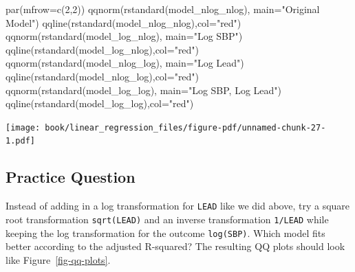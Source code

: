 \documentclass[
  letterpaper,
]{krantz}
\makeatletter
\newenvironment{Shaded}{\begin{snugshade}}{\end{snugshade}}
\newcommand{\AttributeTok}[1]{\textcolor[rgb]{0.40,0.45,0.13}{#1}}
\newcommand{\DecValTok}[1]{\textcolor[rgb]{0.68,0.00,0.00}{#1}}
\newcommand{\FunctionTok}[1]{\textcolor[rgb]{0.28,0.35,0.67}{#1}}
\newcommand{\NormalTok}[1]{\textcolor[rgb]{0.00,0.23,0.31}{#1}}
\newcommand{\StringTok}[1]{\textcolor[rgb]{0.13,0.47,0.30}{#1}}
\newenvironment{kframe}{%
\medskip{}
\setlength{\fboxsep}{.8em}
 \def\at@end@of@kframe{}%
 \ifinner\ifhmode%
  \def\at@end@of@kframe{\end{minipage}}%
  \begin{minipage}{\columnwidth}%
 \fi\fi%
 \def\FrameCommand##1{\hskip\@totalleftmargin \hskip-\fboxsep
 \colorbox{shadecolor}{##1}\hskip-\fboxsep
     \hskip-\linewidth \hskip-\@totalleftmargin \hskip\columnwidth}%
 \MakeFramed {\advance\hsize-\width
   \@totalleftmargin\z@ \linewidth\hsize
   \@setminipage}}%
 {\par\unskip\endMakeFramed%
 \at@end@of@kframe}
\renewenvironment{Shaded}{\begin{kframe}}{\end{kframe}}
\makeatother
\begin{document}
\begin{Shaded}
\begin{Highlighting}[]
\FunctionTok{par}\NormalTok{(}\AttributeTok{mfrow=}\FunctionTok{c}\NormalTok{(}\DecValTok{2}\NormalTok{,}\DecValTok{2}\NormalTok{))}
\FunctionTok{qqnorm}\NormalTok{(}\FunctionTok{rstandard}\NormalTok{(model\_nlog\_nlog), }\AttributeTok{main=}\StringTok{"Original Model"}\NormalTok{) }
\FunctionTok{qqline}\NormalTok{(}\FunctionTok{rstandard}\NormalTok{(model\_nlog\_nlog),}\AttributeTok{col=}\StringTok{"red"}\NormalTok{)}
\FunctionTok{qqnorm}\NormalTok{(}\FunctionTok{rstandard}\NormalTok{(model\_log\_nlog), }\AttributeTok{main=}\StringTok{"Log SBP"}\NormalTok{) }
\FunctionTok{qqline}\NormalTok{(}\FunctionTok{rstandard}\NormalTok{(model\_log\_nlog),}\AttributeTok{col=}\StringTok{"red"}\NormalTok{)}
\FunctionTok{qqnorm}\NormalTok{(}\FunctionTok{rstandard}\NormalTok{(model\_nlog\_log), }\AttributeTok{main=}\StringTok{"Log Lead"}\NormalTok{) }
\FunctionTok{qqline}\NormalTok{(}\FunctionTok{rstandard}\NormalTok{(model\_nlog\_log),}\AttributeTok{col=}\StringTok{"red"}\NormalTok{)}
\FunctionTok{qqnorm}\NormalTok{(}\FunctionTok{rstandard}\NormalTok{(model\_log\_log), }\AttributeTok{main=}\StringTok{"Log SBP, Log Lead"}\NormalTok{) }
\FunctionTok{qqline}\NormalTok{(}\FunctionTok{rstandard}\NormalTok{(model\_log\_log),}\AttributeTok{col=}\StringTok{"red"}\NormalTok{)}
\end{Highlighting}
\end{Shaded}

\begin{center}
\texttt{[image: book/linear\_regression\_files/figure-pdf/unnamed-chunk-27-1.pdf]}
\end{center}

\subsection{Practice Question}\label{practice-question-22}

Instead of adding in a log transformation for \texttt{LEAD} like we did
above, try a square root transformation \texttt{sqrt(LEAD)} and an
inverse transformation \texttt{1/LEAD} while keeping the log
transformation for the outcome \texttt{log(SBP)}. Which model fits
better according to the adjusted R-squared? The resulting QQ plots
should look like Figure~\ref{fig-qq-plots}.
\end{document}
